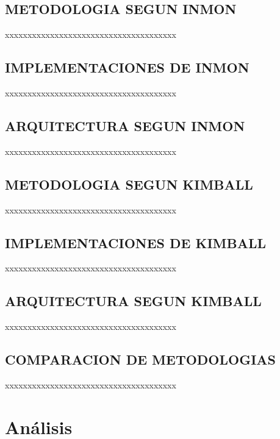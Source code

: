 \documentclass[%
 reprint,
 amsmath,amssymb,
 aps,
]{revtex4-1}
\begin{document}
\subsection{METODOLOGIA SEGUN INMON}	
xxxxxxxxxxxxxxxxxxxxxxxxxxxxxxxxxxxxxx 



\subsection{IMPLEMENTACIONES DE  INMON}
xxxxxxxxxxxxxxxxxxxxxxxxxxxxxxxxxxxxxx 

\subsection{ARQUITECTURA SEGUN INMON}
xxxxxxxxxxxxxxxxxxxxxxxxxxxxxxxxxxxxxx 

\subsection{METODOLOGIA SEGUN KIMBALL}	
xxxxxxxxxxxxxxxxxxxxxxxxxxxxxxxxxxxxxx 

\subsection{IMPLEMENTACIONES DE KIMBALL}
xxxxxxxxxxxxxxxxxxxxxxxxxxxxxxxxxxxxxx 

\subsection{ARQUITECTURA SEGUN KIMBALL}

xxxxxxxxxxxxxxxxxxxxxxxxxxxxxxxxxxxxxx 


\subsection{COMPARACION DE METODOLOGIAS}	
xxxxxxxxxxxxxxxxxxxxxxxxxxxxxxxxxxxxxx \cite{kumar}\\

\section{Análisis}
\end{document}
